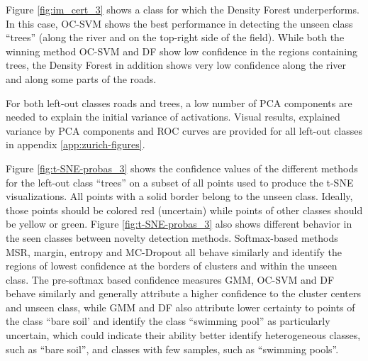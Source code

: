 \documentclass[10pt]{article}
\begin{document}

Figure \ref{fig:im_cert_3} shows a class for which the Density Forest underperforms. In this case, OC-SVM shows the best performance in detecting the unseen class ``trees'' (along the river and on the top-right side of the field). While both the winning method OC-SVM and DF show low confidence in the regions containing trees, the Density Forest in addition shows very low confidence along the river and along some parts of the roads.


For both left-out classes roads and trees, a low number of \gls{PCA} components are needed to explain the initial variance of activations. Visual results, explained variance by \gls{PCA} components and \gls{ROC} curves are provided for all left-out classes in appendix \ref{app:zurich-figures}.

Figure \ref{fig:t-SNE-probas_3} shows the confidence values of the different methods for the left-out class ``trees'' on a subset of all points used to produce the \gls{t-SNE} visualizations. All points with a solid border belong to the unseen class. Ideally, those points should be colored red (uncertain) while points of other classes should be yellow or green. Figure \ref{fig:t-SNE-probas_3} also shows different behavior in the seen classes between novelty detection methods. Softmax-based methods \gls{MSR}, margin, entropy and \gls{MC-Dropout} all behave similarly and identify the regions of lowest confidence at the borders of clusters and within the unseen class. The pre-softmax based confidence measures \gls{GMM}, \gls{OC-SVM} and \gls{DF} behave similarly and generally attribute a higher confidence to the cluster centers and unseen class, while \gls{GMM} and \gls{DF} also attribute lower certainty to points of the class ``bare soil' and identify the class ``swimming pool'' as particularly uncertain, which could indicate their ability better identify heterogeneous classes, such as ``bare soil'', and classes with few samples, such as ``swimming pools''.
\end{document}
